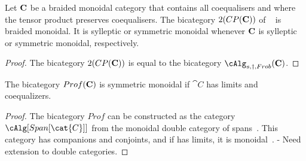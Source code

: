 \begin{cor}
Let ${\bf C}$ be a braided monoidal category that contains all coequalisers and where the tensor product preserves coequalisers. The bicategory $2(CP({\bf C}))$ of ~\cite{heunenvicarywester} is braided monoidal. It is sylleptic or symmetric monoidal whenever ${\bf C}$ is sylleptic or symmetric monoidal, respectively.
\end{cor}

\begin{proof}
The bicategory $2(CP({\bf C}))$ is equal to the bicategory $\cAlg_{s,\dagger, Frob}({\bf C})$.
\end{proof}

\begin{cor}
The bicategory $Prof({\bf {C}})$ is symmetric monoidal if $\cat{C}$ has limits and coequalizers. 
\end{cor}

\begin{proof}
The bicategory $Prof$ can be constructed as the category $\cAlg[Span[\cat{C}]]$ from the monoidal double category of spans~\cite[Examples 4.2]{shulman:frbi}.
This category has companions and conjoints, and if  has limits, it is monoidal~\cite[Examples 4.15, 9.2]{shulman:frbi}.
- Need extension to double categories.
\end{proof}
